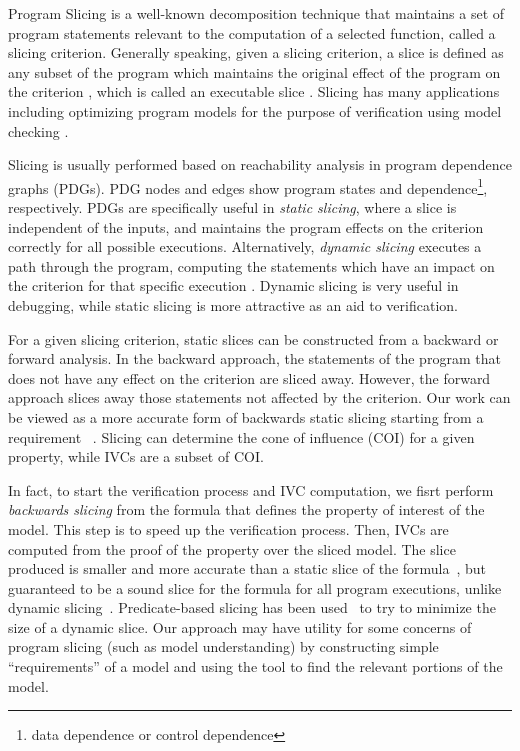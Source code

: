 Program  Slicing  is  a  well-known  decomposition  technique  that  maintains a
set of program statements  relevant to  the computation  of a  selected  function, called a slicing criterion. Generally speaking, given a slicing criterion, a slice is defined
 as any subset of the program which maintains the original effect of the program on the criterion \cite{Weiser97}, which is called an executable slice \cite{Androutsopoulos}.
  Slicing has many applications including optimizing program models
   for the purpose of verification using model checking \cite{Androutsopoulos, Jhala:2005, Dwyer:2006}.

Slicing is usually performed based on reachability analysis in program
dependence graphs (PDGs). PDG nodes and edges show program states and dependence\footnote{data dependence or control dependence}, respectively. PDGs are specifically useful in \emph{static slicing}, where
a slice is independent of the inputs,
 and maintains the program effects on the criterion
correctly for all possible executions. Alternatively,
\emph{dynamic slicing} executes a path through the program, computing the statements which have an impact on the criterion for that
specific execution \cite{Androutsopoulos}. Dynamic slicing is very useful in debugging, while static slicing is more attractive as an aid to verification.

For a given slicing criterion, static slices can be constructed from a backward or forward analysis. In the backward approach, the statements of the program that does not have any effect on the criterion are sliced away. However, the forward approach slices away those statements not affected by the criterion.
Our work can be viewed as a more accurate form of backwards static slicing starting from a requirement ~\cite{Tip95asurvey}. Slicing can determine the cone of influence (COI) for a given property, while IVCs are a subset of COI.

In fact, to start the verification process and IVC computation, we fisrt perform {\em backwards slicing} from the formula that defines the property of interest of the model. This step is to speed up the verification process.
 Then, IVCs are computed from the proof of the property over the sliced model.  The slice produced is smaller and more accurate than a static slice of the formula~\cite{Weiser:1981:slicing}, but guaranteed to be a sound slice for the formula for all program executions, unlike dynamic slicing~\cite{Agrawal:1990:slicing}.  Predicate-based slicing has been used~\cite{Li04:slicing} to try to minimize the size of a dynamic slice.  Our approach may have utility for some concerns of program slicing (such as model understanding) by constructing simple ``requirements'' of a model and using the tool to find the relevant portions of the model.


